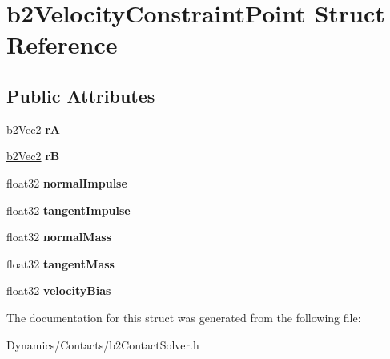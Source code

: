 \hypertarget{structb2VelocityConstraintPoint}{}\section{b2\+Velocity\+Constraint\+Point Struct Reference}
\label{structb2VelocityConstraintPoint}
\subsection*{Public Attributes}
\begin{DoxyCompactItemize}
\item 
\mbox{\label{structb2VelocityConstraintPoint_a0be704259cd5d3902d8581e186546e5e}} 
\mbox{\hyperlink{structb2Vec2}{b2\+Vec2}} {\bfseries rA}
\item 
\mbox{\label{structb2VelocityConstraintPoint_ab5d1c98e09e2f859b71f6d0fda46c0d5}} 
\mbox{\hyperlink{structb2Vec2}{b2\+Vec2}} {\bfseries rB}
\item 
\mbox{\label{structb2VelocityConstraintPoint_a304653be2ca1c1daa72d7b7868b37b11}} 
float32 {\bfseries normal\+Impulse}
\item 
\mbox{\label{structb2VelocityConstraintPoint_ac3e3be335d204bb6a89a7303831cc89b}} 
float32 {\bfseries tangent\+Impulse}
\item 
\mbox{\label{structb2VelocityConstraintPoint_a5997e9781cedbd86333a84a967b59c33}} 
float32 {\bfseries normal\+Mass}
\item 
\mbox{\label{structb2VelocityConstraintPoint_a029692226a637f5e687022041b25043c}} 
float32 {\bfseries tangent\+Mass}
\item 
\mbox{\label{structb2VelocityConstraintPoint_a81d492345d9b1c8f51ec10154ab840f2}} 
float32 {\bfseries velocity\+Bias}
\end{DoxyCompactItemize}


The documentation for this struct was generated from the following file\+:\begin{DoxyCompactItemize}
\item 
Dynamics/\+Contacts/b2\+Contact\+Solver.\+h\end{DoxyCompactItemize}
